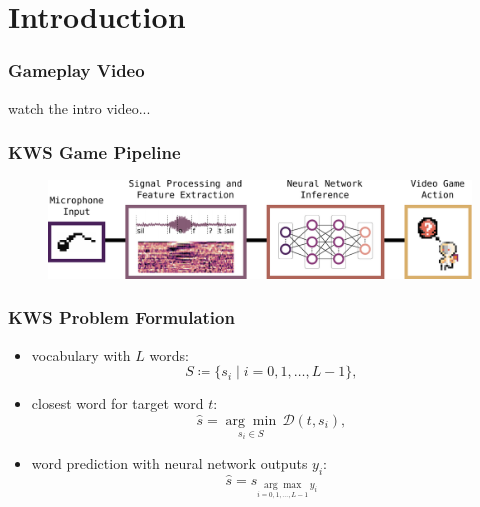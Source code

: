
\section{Introduction}
\begin{frame}
  \frametitle{Gameplay Video}
  watch the intro video...
\end{frame}

\begin{frame}
  \frametitle{KWS Game Pipeline}
  \begin{figure} \includegraphics[width=1.0\textwidth]{../1_intro/figs/intro_kws.pdf} \end{figure}
\end{frame}

\begin{frame}
  \frametitle{KWS Problem Formulation}
  \begin{itemize}
    \item vocabulary with $L$ words:
    \begin{equation*}\label{eq:intro_kws_dict}
      S \coloneqq \{s_i \mid i = 0, 1, \dots, L - 1\},
    \end{equation*}

    \item closest word for target word $t$:
    \begin{equation*}\label{eq:intro_kws_task}
      \hat{s} = \underset{s_i \in S}{\arg \min} \, \mathcal{D}(t, s_i),
    \end{equation*}

    \item word prediction with neural network outputs $y_i$:
    \begin{equation*}\label{eq:intro_kws_class}
      \hat{s} = s_{\underset{i = 0, 1, \dots, L - 1}{\arg \max} \, y_i}
    \end{equation*}

  \end{itemize}
\end{frame}